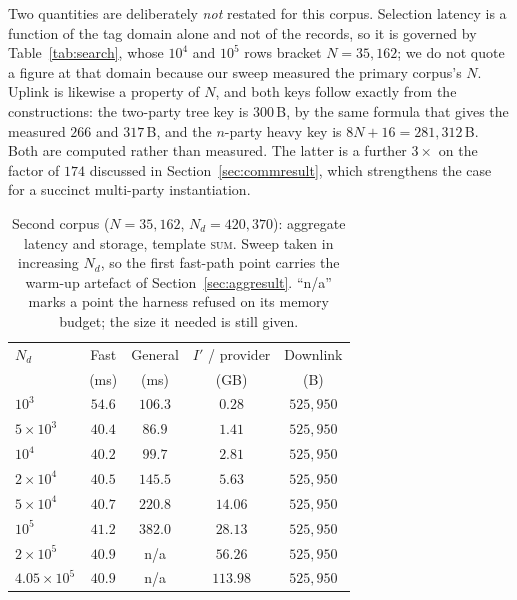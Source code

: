 \documentclass[a4paper,fleqn]{cas-dc}
\begin{document}
Two quantities are deliberately \emph{not} restated for this corpus. Selection
latency is a function of the tag domain alone and not of the records, so it is
governed by Table~\ref{tab:search}, whose $10^4$ and $10^5$ rows bracket
$N=35{,}162$; we do not quote a figure at that domain because our sweep
measured the primary corpus's $N$. Uplink is likewise a property of $N$, and
both keys follow exactly from the constructions: the two-party tree key is
$300$\,B, by the same formula that gives the measured $266$ and $317$\,B, and
the $n$-party heavy key is $8N+16=281{,}312$\,B. Both are computed rather than
measured. The latter is a further $3\times$ on the factor of $174$ discussed
in Section~\ref{sec:commresult}, which strengthens the case for a succinct
multi-party instantiation.

\begin{table}[pos=t]
\caption{Second corpus ($N=35{,}162$, $N_d=420{,}370$): aggregate latency and
storage, template \textsc{sum}. Sweep taken in increasing $N_d$, so the first
fast-path point carries the warm-up artefact of
Section~\ref{sec:aggresult}. ``n/a'' marks a point the harness refused on its
memory budget; the size it needed is still given.}
\label{tab:beijing}
\centering
\footnotesize
\setlength{\tabcolsep}{3pt}
\renewcommand{\arraystretch}{1.2}
\begin{tabular*}{\tblwidth}{@{\extracolsep{\fill}}lcccc@{}}
\toprule
$N_d$ & Fast & General & $I'$ / provider & Downlink \\
      & (ms) & (ms)     & (GB)            & (B) \\
\midrule
$10^3$             & $54.6$ & $106.3$ & $0.28$   & $525{,}950$ \\
$5\times10^3$      & $40.4$ & $86.9$  & $1.41$   & $525{,}950$ \\
$10^4$             & $40.2$ & $99.7$  & $2.81$   & $525{,}950$ \\
$2\times10^4$      & $40.5$ & $145.5$ & $5.63$   & $525{,}950$ \\
$5\times10^4$      & $40.7$ & $220.8$ & $14.06$  & $525{,}950$ \\
$10^5$             & $41.2$ & $382.0$ & $28.13$  & $525{,}950$ \\
$2\times10^5$      & $40.9$ & n/a     & $56.26$  & $525{,}950$ \\
$4.05\times10^5$   & $40.9$ & n/a     & $113.98$ & $525{,}950$ \\
\bottomrule
\end{tabular*}
\end{table}
\end{document}
